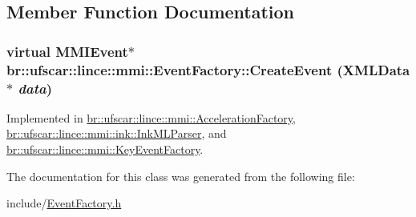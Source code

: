 \subsection{Member Function Documentation}
\hypertarget{classbr_1_1ufscar_1_1lince_1_1mmi_1_1EventFactory_a19ad2165726a29a55c921f569764290b}{
\subsubsection[{CreateEvent}]{\setlength{\rightskip}{0pt plus 5cm}virtual {\bf MMIEvent}$\ast$ br::ufscar::lince::mmi::EventFactory::CreateEvent ({\bf XMLData} $\ast$ {\em data})}}
\label{classbr_1_1ufscar_1_1lince_1_1mmi_1_1EventFactory_a19ad2165726a29a55c921f569764290b}


Implemented in \hyperlink{classbr_1_1ufscar_1_1lince_1_1mmi_1_1AccelerationFactory_a5b8858d27f1b956b6c1f27648c010d74}{br::ufscar::lince::mmi::AccelerationFactory}, \hyperlink{classbr_1_1ufscar_1_1lince_1_1mmi_1_1ink_1_1InkMLParser_aeb533c915bd5909319e3195f14993afa}{br::ufscar::lince::mmi::ink::InkMLParser}, and \hyperlink{classbr_1_1ufscar_1_1lince_1_1mmi_1_1KeyEventFactory_a838221bf5491967315a7475691e72103}{br::ufscar::lince::mmi::KeyEventFactory}.



The documentation for this class was generated from the following file:\begin{DoxyCompactItemize}
\item 
include/\hyperlink{EventFactory_8h}{EventFactory.h}\end{DoxyCompactItemize}
